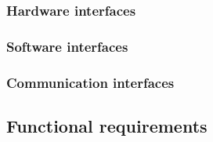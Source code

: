 \clearpage

    \subsubsection{Hardware interfaces}

    \subsubsection{Software interfaces}

    \subsubsection{Communication interfaces}

  \subsection{Functional requirements}

